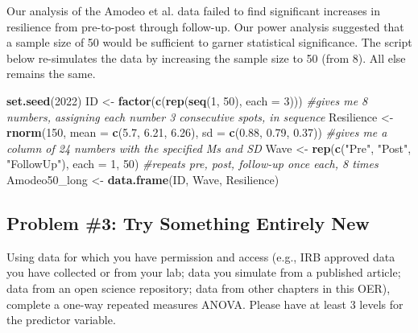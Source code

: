 \documentclass[
  11pt,
]{book}
\newenvironment{Shaded}{\begin{snugshade}}{\end{snugshade}}
\newcommand{\AttributeTok}[1]{\textcolor[rgb]{0.27,0.27,0.27}{#1}}
\newcommand{\CommentTok}[1]{\textcolor[rgb]{0.37,0.37,0.37}{\textit{#1}}}
\newcommand{\DecValTok}[1]{\textcolor[rgb]{0.06,0.06,0.06}{#1}}
\newcommand{\FloatTok}[1]{\textcolor[rgb]{0.06,0.06,0.06}{#1}}
\newcommand{\FunctionTok}[1]{\textcolor[rgb]{0.27,0.27,0.27}{\textbf{#1}}}
\newcommand{\NormalTok}[1]{#1}
\newcommand{\OtherTok}[1]{\textcolor[rgb]{0.37,0.37,0.37}{#1}}
\newcommand{\StringTok}[1]{\textcolor[rgb]{0.5,0.5,0.5}{#1}}
\begin{document}
Our analysis of the Amodeo et al. \citep{amodeo_empowering_2018} data failed to find significant increases in resilience from pre-to-post through follow-up. Our power analysis suggested that a sample size of 50 would be sufficient to garner statistical significance. The script below re-simulates the data by increasing the sample size to 50 (from 8). All else remains the same.

\begin{Shaded}
\begin{Highlighting}[]
\FunctionTok{set.seed}\NormalTok{(}\DecValTok{2022}\NormalTok{)}
\NormalTok{ID }\OtherTok{\textless{}{-}} \FunctionTok{factor}\NormalTok{(}\FunctionTok{c}\NormalTok{(}\FunctionTok{rep}\NormalTok{(}\FunctionTok{seq}\NormalTok{(}\DecValTok{1}\NormalTok{, }\DecValTok{50}\NormalTok{), }\AttributeTok{each =} \DecValTok{3}\NormalTok{)))  }\CommentTok{\#gives me 8 numbers, assigning each number 3 consecutive spots, in sequence}
\NormalTok{Resilience }\OtherTok{\textless{}{-}} \FunctionTok{rnorm}\NormalTok{(}\DecValTok{150}\NormalTok{, }\AttributeTok{mean =} \FunctionTok{c}\NormalTok{(}\FloatTok{5.7}\NormalTok{, }\FloatTok{6.21}\NormalTok{, }\FloatTok{6.26}\NormalTok{), }\AttributeTok{sd =} \FunctionTok{c}\NormalTok{(}\FloatTok{0.88}\NormalTok{, }\FloatTok{0.79}\NormalTok{,}
    \FloatTok{0.37}\NormalTok{))  }\CommentTok{\#gives me a column of 24 numbers with the specified Ms and SD}
\NormalTok{Wave }\OtherTok{\textless{}{-}} \FunctionTok{rep}\NormalTok{(}\FunctionTok{c}\NormalTok{(}\StringTok{"Pre"}\NormalTok{, }\StringTok{"Post"}\NormalTok{, }\StringTok{"FollowUp"}\NormalTok{), }\AttributeTok{each =} \DecValTok{1}\NormalTok{, }\DecValTok{50}\NormalTok{)  }\CommentTok{\#repeats pre, post, follow{-}up once each, 8 times}
\NormalTok{Amodeo50\_long }\OtherTok{\textless{}{-}} \FunctionTok{data.frame}\NormalTok{(ID, Wave, Resilience)}
\end{Highlighting}
\end{Shaded}

\hypertarget{problem-3-try-something-entirely-new}{%
\subsection{Problem \#3: Try Something Entirely New}\label{problem-3-try-something-entirely-new}}

Using data for which you have permission and access (e.g., IRB approved data you have collected or from your lab; data you simulate from a published article; data from an open science repository; data from other chapters in this OER), complete a one-way repeated measures ANOVA. Please have at least 3 levels for the predictor variable.
\end{document}
